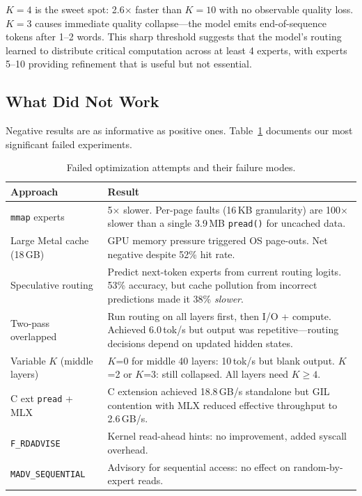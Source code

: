 \documentclass[11pt,twocolumn]{article}
\begin{document}
$K=4$ is the sweet spot: 2.6$\times$ faster than $K=10$ with no observable quality loss.
$K=3$ causes immediate quality collapse---the model emits end-of-sequence tokens after 1--2 words.
This sharp threshold suggests that the model's routing learned to distribute critical computation across at least 4 experts, with experts 5--10 providing refinement that is useful but not essential.

\subsection{What Did Not Work}
\label{sec:negative}

Negative results are as informative as positive ones.
Table~\ref{tab:failures} documents our most significant failed experiments.

\begin{table}[t]
\centering
\small
\caption{Failed optimization attempts and their failure modes.}
\label{tab:failures}
\begin{tabular}{@{}p{2.2cm}p{4.3cm}@{}}
\toprule
\textbf{Approach} & \textbf{Result} \\
\midrule
\texttt{mmap} experts & 5$\times$ slower. Per-page faults (16\,KB granularity) are 100$\times$ slower than a single 3.9\,MB \texttt{pread()} for uncached data. \\
\addlinespace
Large Metal cache (18\,GB) & GPU memory pressure triggered OS page-outs. Net negative despite 52\% hit rate. \\
\addlinespace
Speculative routing & Predict next-token experts from current routing logits. 53\% accuracy, but cache pollution from incorrect predictions made it 38\% \emph{slower}. \\
\addlinespace
Two-pass overlapped & Run routing on all layers first, then I/O + compute. Achieved 6.0\,tok/s but output was repetitive---routing decisions depend on updated hidden states. \\
\addlinespace
Variable $K$ (middle layers) & $K$=0 for middle 40 layers: 10\,tok/s but blank output. $K$=2 or $K$=3: still collapsed. All layers need $K \geq 4$. \\
\addlinespace
C ext \texttt{pread} + MLX & C extension achieved 18.8\,GB/s standalone but GIL contention with MLX reduced effective throughput to 2.6\,GB/s. \\
\addlinespace
\texttt{F\_RDADVISE} & Kernel read-ahead hints: no improvement, added syscall overhead. \\
\addlinespace
\texttt{MADV\_SEQUENTIAL} & Advisory for sequential access: no effect on random-by-expert reads. \\

\end{tabular}
\end{table}
\end{document}
